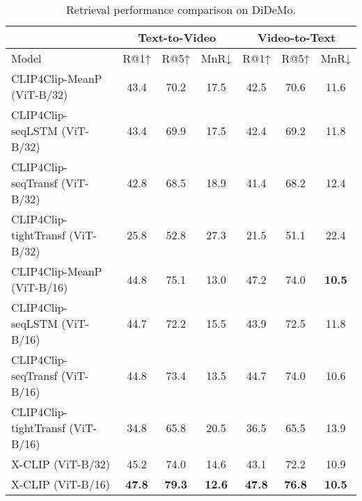 \documentclass[sigconf]{acmart}
\begin{document}
\begin{table*}[]
\caption{Retrieval performance comparison on DiDeMo.}
\begin{tabular}{l|ccc|ccc}
\hline
           & \multicolumn{3}{c|}{Text-to-Video}             & \multicolumn{3}{c}{Video-to-Text}            \\ \hline
Model      & R@1↑          & R@5↑          & MnR↓          & R@1↑          & R@5↑          & MnR↓         \\ \hline
CLIP4Clip-MeanP (ViT-B/32)  & 43.4          & 70.2          & 17.5          & 42.5          & 70.6          & 11.6          \\
 CLIP4Clip-seqLSTM (ViT-B/32)     & 43.4 & 69.9 & 17.5 & 42.4 & 69.2 & 11.8 \\
 CLIP4Clip-seqTransf (ViT-B/32)    & 42.8 & 68.5 & 18.9 & 41.4 & 68.2 & 12.4 \\
 CLIP4Clip-tightTransf (ViT-B/32)   & 25.8 & 52.8 & 27.3 & 21.5 & 51.1 & 22.4 \\
CLIP4Clip-MeanP (ViT-B/16)  & 44.8          & 75.1          & 13.0          & 47.2          & 74.0          & \textbf{10.5} \\ 
CLIP4Clip-seqLSTM (ViT-B/16)  & 44.7 & 72.2 & 15.5 & 43.9 & 72.5 & 11.8  \\ 
CLIP4Clip-seqTransf (ViT-B/16)  & 44.8          & 73.4          & 13.5          & 44.7          & 74.0          & 10.6 \\ 
CLIP4Clip-tightTransf (ViT-B/16)  & 34.8 & 65.8 & 20.5 & 36.5 & 65.5 & 13.9 \\ 
\hline
X-CLIP (ViT-B/32)    & 45.2          & 74.0          & 14.6          & 43.1          & 72.2          & 10.9          \\
X-CLIP (ViT-B/16)    & \textbf{47.8} & \textbf{79.3} & \textbf{12.6} & \textbf{47.8} & \textbf{76.8} & \textbf{10.5} \\ \hline
\end{tabular}
\label{tab:didemo_performance2}
\end{table*}
\end{document}
